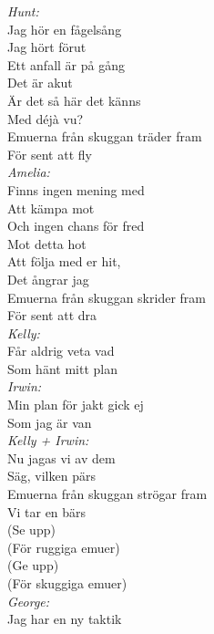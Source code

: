 \documentclass[a6paper, 10pt, twoside]{article}
\begin{document}
\begin{center}
\end{center}
\begin{lyrics}
\textit{Hunt:}\\
Jag hör en fågelsång\\
Jag hört förut\\
Ett anfall är på gång\\
Det är akut\\
Är det så här det känns\\
Med déjà vu?\\
Emuerna från skuggan träder fram\\
För sent att fly
\vspace{5pt}\\
\textit{Amelia:}\\
Finns ingen mening med\\
Att kämpa mot\\
Och ingen chans för fred\\
Mot detta hot\\
Att följa med er hit,\\
Det ångrar jag\\
Emuerna från skuggan skrider fram\\
För sent att dra
\vspace{5pt}\\
\textit{Kelly:}\\
Får aldrig veta vad\\
Som hänt mitt plan\\
\textit{Irwin:}\\
Min plan för jakt gick ej\\
Som jag är van\\
\textit{Kelly + Irwin:}\\
Nu jagas vi av dem\\
Säg, vilken pärs\\
Emuerna från skuggan strögar fram\\
Vi tar en bärs
\vspace{5pt}\\
(Se upp)\\
(För ruggiga emuer)\\
(Ge upp)\\
(För skuggiga emuer)
\vspace{5pt}\\
\textit{George:}\\
Jag har en ny taktik\\

\end{lyrics}
\end{document}
